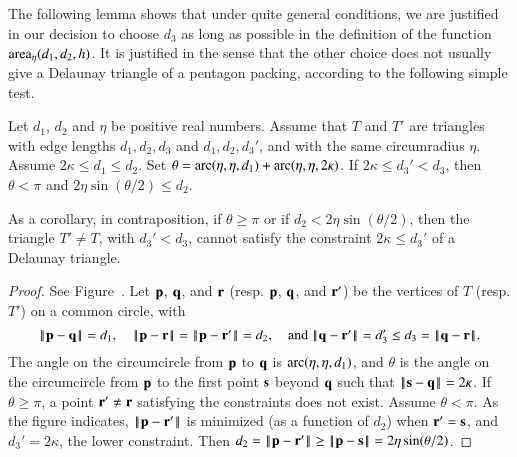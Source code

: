 The following lemma shows that under quite general
conditions, we are justified in our decision to choose $d_3$ as long
as possible in the definition of the function ${\operatorname{area}}_\eta(d_1,d_2,h)$.  It
is justified in the sense that the other choice does not usually give
a Delaunay triangle of a pentagon packing, according to the following
simple test.

\begin{lemma}  
  Let $d_1$, $d_2$ and $\eta$ be positive real numbers.  Assume that
  $T$ and $T'$ are triangles with edge lengths $d_1,d_2,d_3$ and
  $d_1,d_2,d_3'$, and with the same circumradius $\eta$. Assume
  $2\kappa\le d_1\le d_2$.  Set $\theta =
  \operatorname{arc}(\eta,\eta,d_1)+\operatorname{arc}(\eta,\eta,2\kappa)$.  If $2\kappa \le d_3'
  < d_3$, then $\theta < \pi$ and $2\eta\sin(\theta/2) \le d_2$.
\end{lemma}

As a corollary, 
in contraposition, if $\theta\ge\pi$ or if $d_2 < 2\eta\sin(\theta/2)$,
then the triangle $T'\ne T$, with $d_3' < d_3$,
cannot satisfy the constraint $2\kappa\le d_3'$ of a  Delaunay triangle.


\begin{proof} 
  See Figure~.  Let ${\mathbf p}$, ${\mathbf q}$, and ${\mathbf r}$ (resp. ${\mathbf p}$,
  ${\mathbf q}$, and ${\mathbf r}'$) be the vertices of $T$ (resp. $T'$) on a common
  circle, with
\[
\norm{\p}{\q} =d_1, 
\quad\norm{\p}{\r}=\norm{\p}{\r'}=d_2, \quad\text{and } 
\norm{\q}{\r'} = d_3' \le d_3=\norm{\q}{\r}.
\]
The angle on the circumcircle from ${\mathbf p}$ to ${\mathbf q}$ is
$\operatorname{arc}(\eta,\eta,d_1)$, and $\theta$ is the angle on the circumcircle
from ${\mathbf p}$ to the first point ${\mathbf s}$ beyond ${\mathbf q}$ such that
$\norm{\s}{\q}=2\kappa$.  If $\theta\ge\pi$, a point ${\mathbf r}'\ne {\mathbf r}$
satisfying the constraints does not exist.  Assume $\theta < \pi$.  As
the figure indicates, $\norm{\p}{\r'}$ is minimized (as a function of
$d_2$) when ${\mathbf r}'={\mathbf s}$, and $d_3' = 2\kappa$, the lower constraint.
Then $d_2 = \norm{\p}{\r'}\ge \norm{\p}{\s}= 2\eta\sin(\theta/2)$.
\end{proof}



